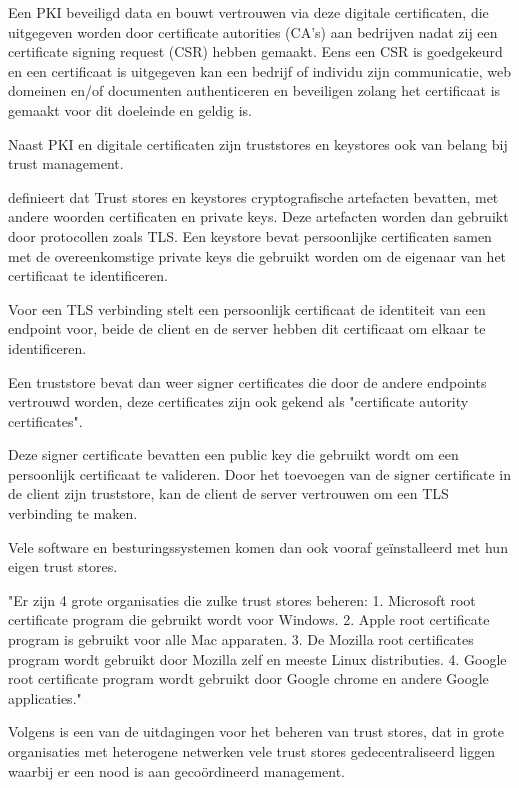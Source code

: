 Een PKI beveiligd data en bouwt vertrouwen via deze digitale certificaten, die uitgegeven worden door certificate autorities (CA's) aan bedrijven nadat zij een certificate signing request (CSR) hebben gemaakt. Eens een CSR is goedgekeurd en een certificaat is uitgegeven kan een bedrijf of individu zijn communicatie, web domeinen en/of documenten authenticeren en beveiligen zolang het certificaat is gemaakt voor dit doeleinde en geldig is. \autocite{GlobalSign}

Naast PKI en digitale certificaten zijn truststores en keystores ook van belang bij trust management.

\textcite{IBM_2023} definieert dat Trust stores en keystores cryptografische artefacten bevatten, met andere woorden certificaten en private keys. Deze artefacten worden dan gebruikt door protocollen zoals TLS. Een keystore bevat persoonlijke certificaten samen met de overeenkomstige private keys die gebruikt worden om de eigenaar van het certificaat te identificeren.

Voor een TLS verbinding stelt een persoonlijk certificaat de identiteit van een endpoint voor, beide de client en de server hebben dit certificaat om elkaar te identificeren.

Een truststore bevat dan weer signer certificates die door de andere endpoints vertrouwd worden, deze certificates zijn ook gekend als "certificate autority certificates".

Deze signer certificate bevatten een public key die gebruikt wordt om een persoonlijk certificaat te valideren. Door het toevoegen van de signer certificate in de client zijn truststore, kan de client de server vertrouwen om een TLS verbinding te maken.

Vele software en besturingssystemen komen dan ook vooraf geïnstalleerd met hun eigen trust stores.

"Er zijn 4 grote organisaties die zulke trust stores beheren: 1. Microsoft root certificate program die gebruikt wordt voor Windows. 2. Apple root certificate program is gebruikt voor alle Mac apparaten. 3. De Mozilla root certificates program wordt gebruikt door Mozilla zelf en meeste Linux distributies. 4. Google root certificate program wordt gebruikt door Google chrome en andere Google applicaties." \autocite{Encrypt_Cons}

Volgens \textcite{SSL_ins} is een van de uitdagingen voor het beheren van trust stores, dat in grote organisaties met heterogene netwerken vele trust stores gedecentraliseerd liggen waarbij er een nood is aan gecoördineerd management.

